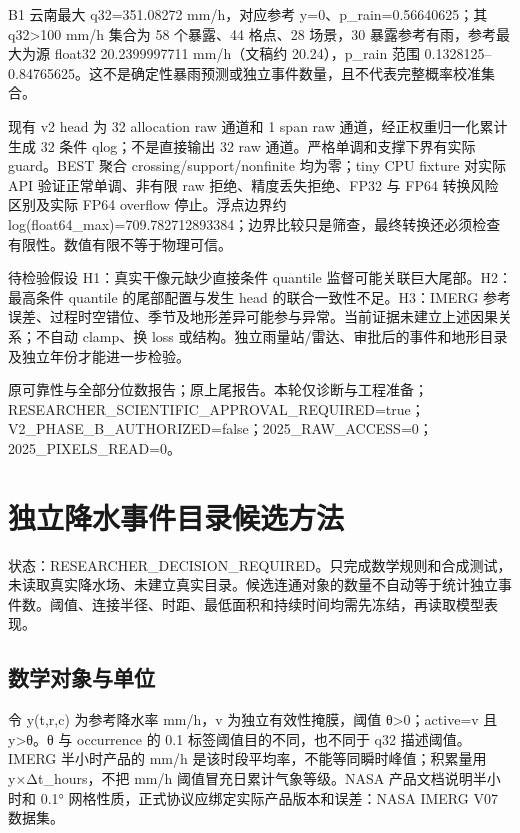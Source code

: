 \documentclass[UTF8,a4paper,10pt,fontset=fandol]{ctexart}
\begin{document}
B1 云南最大 q32=351.08272 mm/h，对应参考 y=0、p\_rain=0.56640625；其 q32>100 mm/h 集合为 58 个暴露、44 格点、28 场景，30 暴露参考有雨，参考最大为源 float32 20.2399997711 mm/h（文稿约 20.24），p\_rain 范围 0.1328125–0.84765625。这不是确定性暴雨预测或独立事件数量，且不代表完整概率校准集合。\par

现有 v2 head 为 32 allocation raw 通道和 1 span raw 通道，经正权重归一化累计生成 32 条件 qlog；不是直接输出 32 raw 通道。严格单调和支撑下界有实际 guard。BEST 聚合 crossing/support/nonfinite 均为零；tiny CPU fixture 对实际 API 验证正常单调、非有限 raw 拒绝、精度丢失拒绝、FP32 与 FP64 转换风险区别及实际 FP64 overflow 停止。浮点边界约 log(float64\_max)=709.782712893384；边界比较只是筛查，最终转换还必须检查有限性。数值有限不等于物理可信。\par

待检验假设 H1：真实干像元缺少直接条件 quantile 监督可能关联巨大尾部。H2：最高条件 quantile 的尾部配置与发生 head 的联合一致性不足。H3：IMERG 参考误差、过程时空错位、季节及地形差异可能参与异常。当前证据未建立上述因果关系；不自动 clamp、换 loss 或结构。独立雨量站/雷达、审批后的事件和地形目录及独立年份才能进一步检验。\par

原可靠性与全部分位数报告；原上尾报告。本轮仅诊断与工程准备；RESEARCHER\_SCIENTIFIC\_APPROVAL\_REQUIRED=true；V2\_PHASE\_B\_AUTHORIZED=false；2025\_RAW\_ACCESS=0；2025\_PIXELS\_READ=0。\par

\clearpage
\section*{独立降水事件目录候选方法}

状态：RESEARCHER\_DECISION\_REQUIRED。只完成数学规则和合成测试，未读取真实降水场、未建立真实目录。候选连通对象的数量不自动等于统计独立事件数。阈值、连接半径、时距、最低面积和持续时间均需先冻结，再读取模型表现。\par

\subsection*{数学对象与单位}

令 y(t,r,c) 为参考降水率 mm/h，v 为独立有效性掩膜，阈值 θ>0；active=v 且 y>θ。θ 与 occurrence 的 0.1 标签阈值目的不同，也不同于 q32 描述阈值。IMERG 半小时产品的 mm/h 是该时段平均率，不能等同瞬时峰值；积累量用 y×Δt\_hours，不把 mm/h 阈值冒充日累计气象等级。NASA 产品文档说明半小时和 0.1° 网格性质，正式协议应绑定实际产品版本和误差：NASA IMERG V07 数据集。\par
\end{document}
